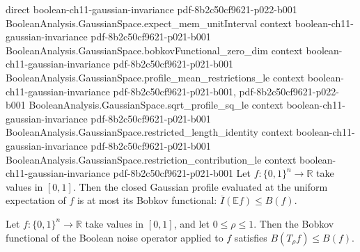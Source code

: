 \begin{theorem}
  {direct}
  {boolean-ch11-gaussian-invariance}
  {pdf-8b2c50cf9621-p022-b001}
\proofstep
  {BooleanAnalysis.GaussianSpace.expect_mem_unitInterval}
  {context}
  {boolean-ch11-gaussian-invariance}
  {pdf-8b2c50cf9621-p021-b001}
\proofstep
  {BooleanAnalysis.GaussianSpace.bobkovFunctional_zero_dim}
  {context}
  {boolean-ch11-gaussian-invariance}
  {pdf-8b2c50cf9621-p021-b001}
\proofstep
  {BooleanAnalysis.GaussianSpace.profile_mean_restrictions_le}
  {context}
  {boolean-ch11-gaussian-invariance}
  {pdf-8b2c50cf9621-p021-b001,
    pdf-8b2c50cf9621-p022-b001}
\proofstep
  {BooleanAnalysis.GaussianSpace.sqrt_profile_sq_le}
  {context}
  {boolean-ch11-gaussian-invariance}
  {pdf-8b2c50cf9621-p021-b001}
\proofstep
  {BooleanAnalysis.GaussianSpace.restricted_length_identity}
  {context}
  {boolean-ch11-gaussian-invariance}
  {pdf-8b2c50cf9621-p021-b001}
\proofstep
  {BooleanAnalysis.GaussianSpace.restriction_contribution_le}
  {context}
  {boolean-ch11-gaussian-invariance}
  {pdf-8b2c50cf9621-p021-b001}
Let $f:\{0,1\}^n\to\mathbb R$ take values in $[0,1]$. Then the closed Gaussian profile
evaluated at the uniform expectation of $f$ is at most its Bobkov functional: $\overline
I(\mathbb E f)\le B(f)$.
\end{theorem}

\begin{lemma}
\leanok
{}
Let $f:\{0,1\}^n\to\mathbb R$ take values in $[0,1]$, and let $0\le\rho\le1$. Then the
Bobkov functional of the Boolean noise operator applied to $f$ satisfies $B(T_\rho f)\le
B(f)$.
\end{lemma}

